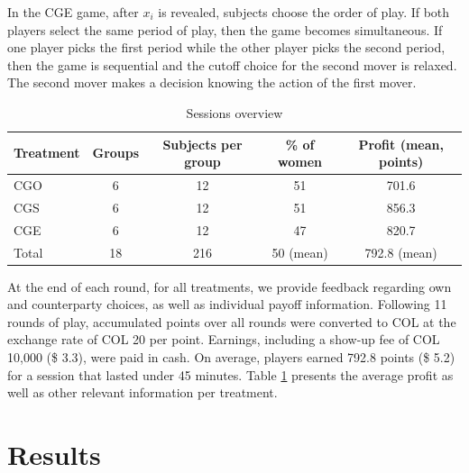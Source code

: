 \documentclass[12pt, letterpaper]{article}
\theoremstyle{plain}
\begin{document}
In the CGE game, after $x_i$ is revealed, subjects choose the order of play. If both players select the same period of play, then the game becomes simultaneous. If one player picks the first period while the other player picks the second period, then the game is sequential and the cutoff choice for the second mover is relaxed. The second mover makes a decision knowing the action of the first mover. 

\begin{table}[ht]
\centering
\caption{Sessions overview }
\hline
\begin{tabular}{lcccc}
  Treatment & Groups & Subjects per group & \% of women & Profit (mean, points)\\
  \hline  
  CGO & 6 & 12 & 51 & 701.6 \\
  CGS & 6 & 12 & 51 & 856.3 \\
  CGE & 6 & 12 & 47 & 820.7 \\
\hline
Total & 18 & 216 &  50 (mean) & 792.8 (mean)\\
\end{tabular}

\label{session}
\end{table}

At the end of each round, for all treatments, we provide feedback regarding own and counterparty choices, as well as individual payoff information. Following 11 rounds of play, accumulated points over all rounds were converted to COL at the exchange rate of COL 20 per point. Earnings, including a show-up fee of COL 10,000 (\$ 3.3), were paid in cash. On average, players earned 792.8 points (\$ 5.2) for a session that lasted under 45 minutes. Table \ref{session} presents the average profit as well as other relevant information per treatment. 


\section{Results}
\label{sec:results}
\end{document}
